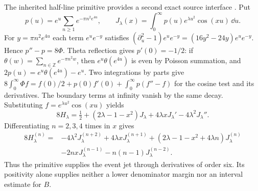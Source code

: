 The inherited half-line primitive provides a second exact source
interface \cite{OARecord}. Put
\[
 p(u)=e^u\sum_{n\ge1}e^{-\pi n^2e^{4u}},\qquad
 J_\lambda(x)=\int_0^\infty p(u)e^{\lambda u^2}\cos(xu)\,\dd u.
\]
For \(y=\pi n^2e^{4u}\) each term \(e^u e^{-y}\) satisfies
\((\partial_u^2-1)e^u e^{-y}=(16y^2-24y)e^u e^{-y}\).
Hence \(p''-p=8\Phi\). Theta reflection gives \(p'(0)=-1/2\):
if \(\theta(w)=\sum_{n\in\mathbb Z}e^{-\pi n^2w}\), then
\(e^u\theta(e^{4u})\) is even by Poisson summation, and
\(2p(u)=e^u\theta(e^{4u})-e^u\). Two integrations by parts
give \(8\int_0^\infty\Phi f=f(0)/2+p(0)f'(0)+\int_0^\infty p(f''-f)\)
for the cosine test and its derivatives. The boundary terms at
infinity vanish by the same decay. Substituting
\(f=e^{\lambda u^2}\cos(xu)\) yields
\begin{equation}
8H_\lambda=\tfrac12+(2\lambda-1-x^2)J_\lambda+
                  4\lambda xJ_\lambda'-4\lambda^2J_\lambda''.
\label{eq:primitive}
\end{equation}
Differentiating \(n=2,3,4\) times in \(x\) gives
\[
\begin{aligned}
8H_\lambda^{(n)}
={}&-4\lambda^2J_\lambda^{(n+2)}
    +4\lambda xJ_\lambda^{(n+1)}
    +(2\lambda-1-x^2+4\lambda n)J_\lambda^{(n)}\\
 &-2nxJ_\lambda^{(n-1)}-n(n-1)J_\lambda^{(n-2)} .
\end{aligned}
\]
Thus the primitive supplies the event jet through derivatives of
order six. Its positivity alone supplies neither a lower
denominator margin nor an interval estimate for \(B\).
